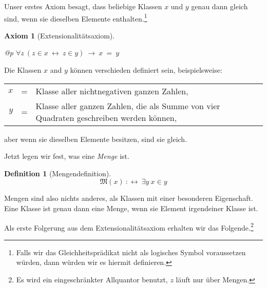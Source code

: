 \documentclass[a4paper,german,10pt,twoside]{book}
\newtheorem{ax}{Axiom}
\theoremstyle{definition}
\newtheorem{defn}[thm]{Definition}
\theoremstyle{remark}
\begin{document}
\par
Unser erstes Axiom besagt, dass beliebige Klassen $x$ und $y$ genau dann gleich sind, wenn sie dieselben Elemente enthalten.\footnote{Falls wir das Gleichheitspr{\"a}dikat nicht als logisches Symbol voraussetzen w{\"u}rden, dann w{\"u}rden wir es hiermit definieren.}

\begin{ax}[Extensionalit{\"a}tsaxiom]
\label{axiom:extensionality} \hypertarget{axiom:extensionality}{}
\mbox{}
\begin{longtable}{{@{\extracolsep{\fill}}p{\linewidth}}}
\centering $\forall z\ (z \in x\ \leftrightarrow \ z \in y)\ \rightarrow \ x \ =  \ y$
\end{longtable}

\end{ax}

Die Klassen $x$ and $y$ k{\"o}nnen verschieden definiert sein, beispielsweise:
\par
\begin{tabularx}{\linewidth}{rcX}
  $x$ & = & Klasse aller nichtnegativen ganzen Zahlen, \\
  $y$ & = & Klasse aller ganzen Zahlen, die als Summe von vier Quadraten geschreiben werden k{\"o}nnen,
\end{tabularx}
\par
aber wenn sie dieselben Elemente besitzen, sind sie gleich.


\par
Jetzt legen wir fest, was eine \emph{Menge} ist.

\begin{defn}[Mengendefinition]
\label{isSet} \hypertarget{isSet}{}
$$\mathfrak{M}(x)\ :\leftrightarrow \ \exists y\ x \in y$$

\end{defn}

Mengen sind also nichts anderes, als Klassen mit einer besonderen Eigenschaft. Eine Klasse ist genau dann eine Menge, wenn sie Element irgendeiner Klasse ist.


\par
Als erste Folgerung aus dem Extensionalit{\"a}tsaxiom erhalten wir das Folgende.\footnote{Es wird ein eingeschr{\"a}nkter Allquantor benutzt, $z$ l{\"a}uft nur {\"u}ber Mengen.}
\end{document}
